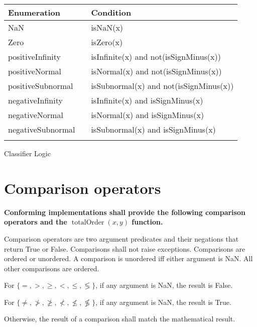 \documentclass{article}
\DeclareMathOperator{\totalOrder}{totalOrder}
\newcommand{\spec}[1]{{\bf #1}}
\begin{document}
\begin{center}
\begin{threeparttable}[htb]
\begin{tabular}{l c l}
\toprule
Enumeration & & Condition\\
\midrule \addlinespace[1.2ex]
  NaN                &  &  isNaN(x)\\
  Zero               &  &  isZero(x)\\
  positiveInfinity   &  &  isInfinite(x) and not(isSignMinus(x))\\
  positiveNormal     &  &  isNormal(x) and not(isSignMinus(x))\\
  positiveSubnormal  &  &  isSubnormal(x) and not(isSignMinus(x))\\
  negativeInfinity   &  &  isInfinite(x) and isSignMinus(x)\\
  negativeNormal     &  &  isNormal(x) and isSignMinus(x)\\
  negativeSubnormal  &  &  isSubnormal(x) and isSignMinus(x)\\ \addlinespace[0.2ex]
\bottomrule
\end{tabular}
\caption{Classifier Logic} \label{classifier-logic}
\end{threeparttable}
\end{center}


\clearpage
\section{Comparison operators}
\spec{
Conforming implementations shall provide the following comparison operators and the $\totalOrder( x, y )$ function.
}

Comparison operators are two argument predicates and their negations that return True or False.
Comparisons shall not raise exceptions.
Comparisons are ordered or unordered.
A comparison is unordered iff either argument is NaN.
All other comparisons are ordered.

For $\{=, >, \ge, <, \le, \lessgtr\}$, if any argument is NaN, the result is False.

For $\{\not=, \not>, \not\ge, \not<, \not\le, \not\lessgtr\}$, if any argument is NaN, the result is True.

Otherwise, the result of a comparison shall match the mathematical result.
\end{document}
